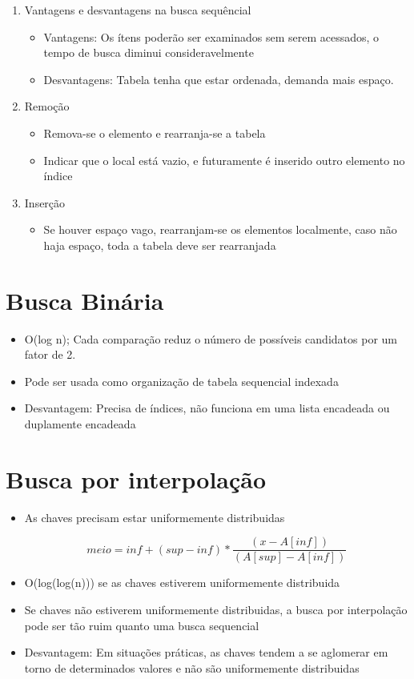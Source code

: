 \documentclass{article}
\begin{document}
\begin{enumerate}
\begin{itemize}
		\end{itemize}
	\item Vantagens e desvantagens na busca sequêncial
		\begin{itemize}
		\item Vantagens: Os ítens poderão ser examinados sem serem acessados, o tempo de busca diminui consideravelmente
		\item Desvantagens: Tabela tenha que estar ordenada, demanda mais espaço.
		\end{itemize}
	\item Remoção
		\begin{itemize}
		\item Remova-se o elemento e rearranja-se a tabela
		\item Indicar que o local está vazio, e futuramente é inserido outro elemento no índice
		\end{itemize}
	\item Inserção
		\begin{itemize}
		\item Se houver espaço vago, rearranjam-se os elementos localmente, caso não haja espaço, toda a tabela deve ser rearranjada
		\end{itemize}
	\end{enumerate}
\section{Busca Binária}
	\begin{itemize}
	\item O(log n); Cada comparação reduz o número de possíveis candidatos por um fator de 2.
	\item Pode ser usada como organização de tabela sequencial indexada
	\item Desvantagem: Precisa de índices, não funciona em uma lista encadeada ou duplamente encadeada
	\end{itemize}

\section{Busca por interpolação}
	\begin{itemize}
	\item As chaves precisam estar uniformemente distribuidas
	
	\begin{equation}
		meio = inf + (sup - inf) * \frac{(x- A[inf])}{(A[sup]-A[inf])}
	\end{equation}		
	
	\item O(log(log(n))) se as chaves estiverem uniformemente distribuida
	\item Se chaves não estiverem uniformemente distribuidas, a busca por interpolação pode ser tão ruim quanto uma busca sequencial
	\item Desvantagem: 	Em situações práticas, as chaves tendem a se aglomerar em torno de determinados valores e não são uniformemente distribuidas
	\end{itemize}
\end{document}
